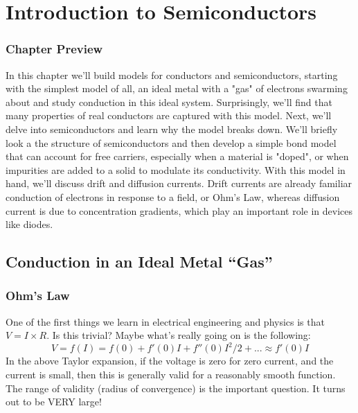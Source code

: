 \graphicspath{{./figs_semi/}}


\chapter{Introduction to Semiconductors}




\subsection{Chapter Preview}

In this chapter we'll build models for conductors and semiconductors, starting with the simplest model of all, an ideal metal with a "gas" of electrons swarming about and study conduction in this ideal system.  Surprisingly, we'll find that many properties of real conductors are captured with this model.  Next, we'll delve into semiconductors and learn why the model breaks down.  We'll briefly look a the structure of semiconductors and then develop a simple bond model that can account for free carriers, especially when a material is "doped", or when impurities are added to a solid to modulate its conductivity.  With this model in hand, we'll discuss drift and diffusion currents.  Drift currents are already familiar conduction of electrons in response to a field, or Ohm's Law, whereas diffusion current is due to concentration gradients, which play an important role in devices like diodes.  




\section{Conduction in an Ideal Metal ``Gas''}


\subsection{Ohm’s Law}

 One of the first things we learn in electrical engineering and physics is that  $V = I \times R$.
 Is this trivial? Maybe what’s really going on is the following:
\begin{equation}
	V = f(I) = f(0) + f'(0)I + f''(0){I^2}/2 + ... \approx f'(0)I
\end{equation}
 In the above Taylor expansion, if the voltage is zero for zero current, and the current is small, then this is generally valid for a reasonably smooth function.   The range of validity (radius of convergence) is the important question. It turns out to be VERY large!
 
